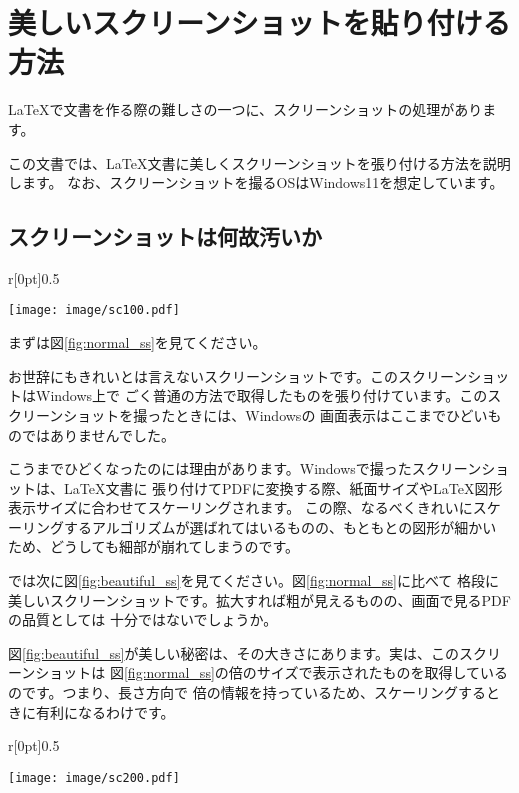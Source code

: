 \chapter{美しいスクリーンショットを貼り付ける方法}
\label{chap:screenshot}

\LaTeX で文書を作る際の難しさの一つに、スクリーンショットの処理があります。

この文書では、\LaTeX 文書に美しくスクリーンショットを張り付ける方法を説明します。
なお、スクリーンショットを撮るOSはWindows11を想定しています。

\section{スクリーンショットは何故汚いか}

\begin{wrapfigure}[11]{r}[0pt]{0.5\textwidth}
  \begin{center}
    \texttt{[image: image/sc100.pdf]}
    \caption{スクリーンショット} \label{fig:normal_ss}
  \end{center}
\end{wrapfigure}

まずは図\ref{fig:normal_ss}を見てください。

お世辞にもきれいとは言えないスクリーンショットです。このスクリーンショットはWindows上で
ごく普通の方法で取得したものを張り付けています。このスクリーンショットを撮ったときには、Windowsの
画面表示はここまでひどいものではありませんでした。

こうまでひどくなったのには理由があります。Windowsで撮ったスクリーンショットは、\LaTeX 文書に
張り付けてPDFに変換する際、紙面サイズや\LaTeX 図形表示サイズに合わせてスケーリングされます。
この際、なるべくきれいにスケーリングするアルゴリズムが選ばれてはいるものの、もともとの図形が細かい
ため、どうしても細部が崩れてしまうのです。

では次に図\ref{fig:beautiful_ss}を見てください。図\ref{fig:normal_ss}に比べて
格段に美しいスクリーンショットです。拡大すれば粗が見えるものの、画面で見るPDFの品質としては
十分ではないでしょうか。

図\ref{fig:beautiful_ss}が美しい秘密は、その大きさにあります。実は、このスクリーンショットは
図\ref{fig:normal_ss}の倍のサイズで表示されたものを取得しているのです。つまり、長さ方向で
倍の情報を持っているため、スケーリングするときに有利になるわけです。

\begin{wrapfigure}[11]{r}[0pt]{0.5\textwidth}
  \begin{center}
    \texttt{[image: image/sc200.pdf]}
    \caption{スクリーンショット} \label{fig:beautiful_ss}
  \end{center}
\end{wrapfigure}



